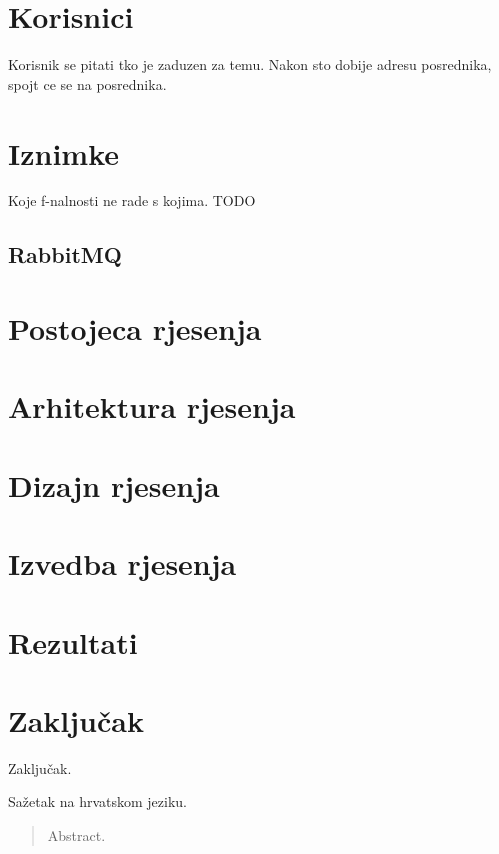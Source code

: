 \documentclass[times, utf8, diplomski, numeric]{fer}
\begin{document}
\chapter{Korisnici}
Korisnik se pitati tko je zaduzen za temu. Nakon sto dobije adresu posrednika, spojt ce se na posrednika.

\chapter{Iznimke}
Koje f-nalnosti ne rade s kojima. TODO


\section{RabbitMQ}



\chapter{Postojeca rjesenja}

\chapter{Arhitektura rjesenja}

\chapter{Dizajn rjesenja}

\chapter{Izvedba rjesenja}

\chapter{Rezultati}

\chapter{Zaključak}
Zaključak.




\begin{sazetak}
Sažetak na hrvatskom jeziku.

\end{sazetak}

\begin{abstract}
Abstract.

\end{abstract}
\end{document}
